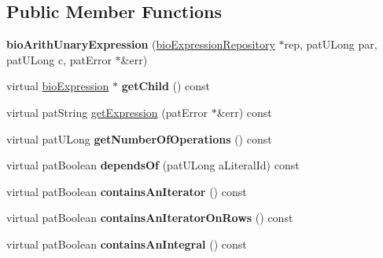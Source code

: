 \subsection*{Public Member Functions}
\begin{DoxyCompactItemize}
\item 
\mbox{\label{classbio_arith_unary_expression_ac8e8a90f5935ff89e5eff3d606b45f1a}} 
{\bfseries bio\+Arith\+Unary\+Expression} (\hyperlink{classbio_expression_repository}{bio\+Expression\+Repository} $\ast$rep, pat\+U\+Long par, pat\+U\+Long c, pat\+Error $\ast$\&err)
\item 
\mbox{\label{classbio_arith_unary_expression_a9b3fb378875ca54fcbd70acf8f6ef7a9}} 
virtual \hyperlink{classbio_expression}{bio\+Expression} $\ast$ {\bfseries get\+Child} () const
\item 
virtual pat\+String \hyperlink{classbio_arith_unary_expression_a974b7779804861f331a75e08db377926}{get\+Expression} (pat\+Error $\ast$\&err) const
\item 
\mbox{\label{classbio_arith_unary_expression_ae40eb0f22afee1e6268d6f2a763c0d21}} 
virtual pat\+U\+Long {\bfseries get\+Number\+Of\+Operations} () const
\item 
\mbox{\label{classbio_arith_unary_expression_a128313ec9bd6f0ef6ebb5f8b67ccc477}} 
virtual pat\+Boolean {\bfseries depends\+Of} (pat\+U\+Long a\+Literal\+Id) const
\item 
\mbox{\label{classbio_arith_unary_expression_ade8b48b1ddca7299bca96c77d97bb8e9}} 
virtual pat\+Boolean {\bfseries contains\+An\+Iterator} () const
\item 
\mbox{\label{classbio_arith_unary_expression_aa8e5a9972f314f6051ad47cd7c892c84}} 
virtual pat\+Boolean {\bfseries contains\+An\+Iterator\+On\+Rows} () const
\item 
\mbox{\label{classbio_arith_unary_expression_af93b8256cead1cb6ba632f360e78f1c2}} 
virtual pat\+Boolean {\bfseries contains\+An\+Integral} () const
\item 
\mbox{\label{classbio_arith_unary_expression_a2f99fbc5344f4610676d40883209a61c}} 

\end{DoxyCompactItemize}
